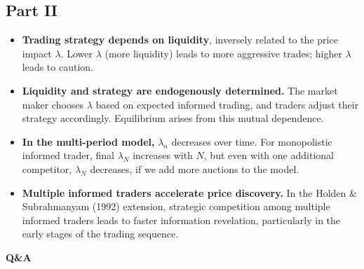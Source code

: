 \documentclass{beamer}
\begin{document}
\subsection{Part II}
\begin{frame}
\begin{itemize}\small

    \item \textbf{Trading strategy depends on liquidity}, inversely related to the price impact \( \lambda \). Lower \( \lambda \) (more liquidity) leads to more aggressive trades; higher \( \lambda \) leads to caution.
    
    \item \textbf{Liquidity and strategy are endogenously determined.} The market maker chooses  \(\lambda\) based on expected informed trading, and traders adjust their strategy accordingly. Equilibrium arises from this mutual dependence.

    \item \textbf{In the multi-period model,} \(\lambda_n\) decreases over time. For monopolistic informed trader, final $\lambda_N$ increases with $N$, but even with one additional competitor, $\lambda_N$ decreases, if we add more auctions to the model.

    \item \textbf{Multiple informed traders accelerate price discovery.} In the Holden & Subrahmanyam (1992) extension, strategic competition among multiple informed traders leads to faster information revelation, particularly in the early stages of the trading sequence.
\end{itemize}
\end{frame}


\begin{frame}
\centering
{\Huge \textbf{Q\&A}}
\end{frame}
\end{document}
